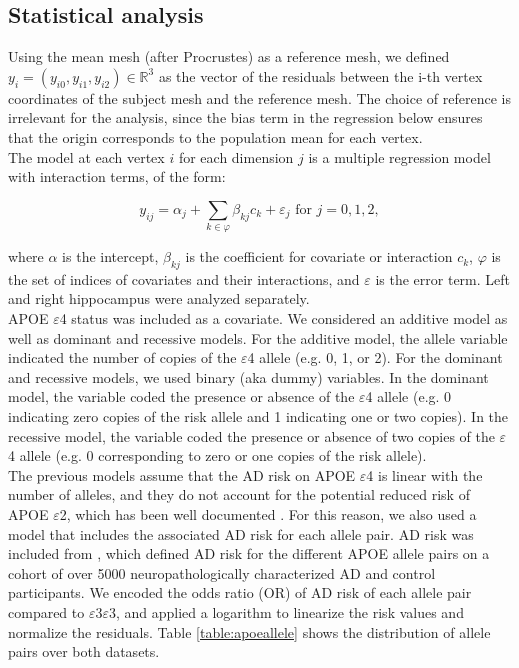 \subsection{Statistical analysis}
\label{subsec:stat}

Using the mean mesh (after Procrustes) as a reference mesh, we defined $y_i=(y_{i0}, y_{i1}, y_{i2}) \in \mathbb{R}^3$ as the vector of the residuals between the i-th vertex coordinates of the subject mesh and the reference mesh. The choice of reference is irrelevant for the analysis, since the bias term in the regression below ensures that the origin corresponds to the population mean for each vertex. \\

The model at each vertex $i$ for each dimension $j$ is a multiple regression model with interaction terms, of the form:

\begin{equation}
    y_{ij} = \alpha_{j} + \sum_{k \in \mathcal{\varphi}} \beta_{kj} c_k + \varepsilon_j \textrm{ for } j = {0, 1, 2},
\end{equation} 

where $\alpha$ is the intercept, $\beta_{kj}$ is the coefficient for covariate or interaction $c_k$, $\mathcal{\varphi}$ is the set of indices of covariates and their interactions, and $\varepsilon$ is the error term. Left and right hippocampus were analyzed separately. \\ 

APOE $\varepsilon$4 status was included as a covariate. We considered an additive model as well as dominant and recessive models. For the additive model, the allele variable indicated the number of copies of the $\varepsilon$4 allele (e.g. 0, 1, or 2). For the dominant and recessive models, we used binary (aka dummy) variables. In the dominant model, the variable coded the presence or absence of the $\varepsilon$4 allele (e.g. 0 indicating zero copies of the risk allele and 1 indicating one or two copies). In the recessive model, the variable coded the presence or absence of two copies of the $\varepsilon$4 allele (e.g. 0 corresponding to zero or one copies of the risk allele). \\

The previous models assume that the AD risk on APOE $\varepsilon$4 is linear with the number of alleles, and they do not account for the potential reduced risk of APOE $\varepsilon$2, which has been well documented \cite{Genin2011,Liu2013}. For this reason, we also used a model that includes the associated AD risk for each allele pair. AD risk was included from \cite{Reiman2020}, which defined AD risk for the different APOE allele pairs on a cohort of over 5000 neuropathologically characterized AD and control participants. We encoded the odds ratio (OR) of AD risk of each allele pair compared to $\varepsilon$3$\varepsilon$3, and applied a logarithm to linearize the risk values and normalize the residuals. Table \ref{table:apoeallele} shows the distribution of allele pairs over both datasets. \\


